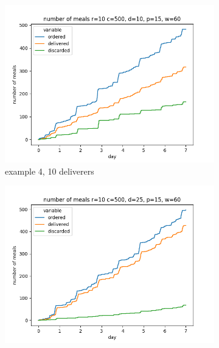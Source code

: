 \begin{center}

    \begin{figure}
        \centering
        \begin{subfigure}[m]{0.30\textwidth}
            \centering
            \includegraphics[width=\textwidth]{sections/run2/week_nm_rad_32food_ordering_distribution_500_10_10_60}
            \caption{example 4, 10 deliverers}
        \end{subfigure}
        \hfill
        \begin{subfigure}[m]{0.30\textwidth}
            \centering
            \includegraphics[width=\textwidth]{sections/run2/week_nm_rad_32food_ordering_distribution_500_10_25_60}

\end{subfigure}
\end{figure}
\end{center}

